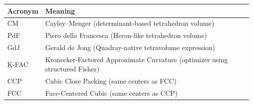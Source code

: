 \documentclass[
  10pt,
]{article}
\begin{document}
\begin{longtable}[]{@{}ll@{}}
\toprule
\begin{minipage}[b]{0.47\columnwidth}\raggedright
Acronym\strut
\end{minipage} & \begin{minipage}[b]{0.47\columnwidth}\raggedright
Meaning\strut
\end{minipage}\tabularnewline
\midrule
\endhead
\begin{minipage}[t]{0.47\columnwidth}\raggedright
CM\strut
\end{minipage} & \begin{minipage}[t]{0.47\columnwidth}\raggedright
Cayley--Menger (determinant-based tetrahedron volume)\strut
\end{minipage}\tabularnewline
\begin{minipage}[t]{0.47\columnwidth}\raggedright
PdF\strut
\end{minipage} & \begin{minipage}[t]{0.47\columnwidth}\raggedright
Piero della Francesca (Heron-like tetrahedron volume)\strut
\end{minipage}\tabularnewline
\begin{minipage}[t]{0.47\columnwidth}\raggedright
GdJ\strut
\end{minipage} & \begin{minipage}[t]{0.47\columnwidth}\raggedright
Gerald de Jong (Quadray-native tetravolume expression)\strut
\end{minipage}\tabularnewline
\begin{minipage}[t]{0.47\columnwidth}\raggedright
K-FAC\strut
\end{minipage} & \begin{minipage}[t]{0.47\columnwidth}\raggedright
Kronecker-Factored Approximate Curvature (optimizer using structured
Fisher)\strut
\end{minipage}\tabularnewline
\begin{minipage}[t]{0.47\columnwidth}\raggedright
CCP\strut
\end{minipage} & \begin{minipage}[t]{0.47\columnwidth}\raggedright
Cubic Close Packing (same centers as FCC)\strut
\end{minipage}\tabularnewline
\begin{minipage}[t]{0.47\columnwidth}\raggedright
FCC\strut
\end{minipage} & \begin{minipage}[t]{0.47\columnwidth}\raggedright
Face-Centered Cubic (same centers as CCP)\strut

\end{minipage}
\end{longtable}
\end{document}
